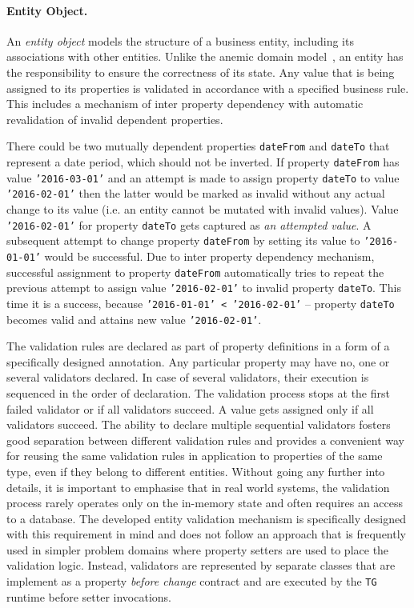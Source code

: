 \documentclass[a4paper,12pt,oneside,openright,final]{memoir} %
\begin{document}
	\paragraph{Entity Object.} 	
  	An \emph{entity object} models the structure of a business entity, including its associations with other entities.
	Unlike the anemic domain model~\cite{fowler2003}, an entity has the responsibility to ensure the correctness of its state.
	Any value that is being assigned to its properties is validated in accordance with a specified business rule.
	This includes a mechanism of inter property dependency with automatic revalidation of invalid dependent properties.
	
	\begin{tcolorbox}[title=Example: dependent properties]
	\footnotesize
		There could be two mutually dependent properties \texttt{dateFrom} and \texttt{dateTo} that represent a date period, which should not be inverted.
		If property \texttt{dateFrom} has value \texttt{'2016-03-01'} and an attempt is made to assign property \texttt{dateTo} to value \texttt{'2016-02-01'} then the latter would be marked as invalid without any actual change to its value (i.e. an entity cannot be mutated with invalid values).
		Value \texttt{'2016-02-01'} for property \texttt{dateTo} gets captured as \emph{an attempted value}.
		A subsequent attempt to change property \texttt{dateFrom} by setting its value to \texttt{'2016-01-01'} would be successful.
		Due to inter property dependency mechanism, successful assignment to property \texttt{dateFrom} automatically tries to repeat the previous attempt to assign value \texttt{'2016-02-01'} to invalid property \texttt{dateTo}.
		This time it is a success, because \texttt{'2016-01-01' < '2016-02-01'} -- property \texttt{dateTo} becomes valid and attains new value \texttt{'2016-02-01'}.
 	\end{tcolorbox}
	
	The validation rules are declared as part of property definitions in a form of a specifically designed annotation.
	Any particular property may have no, one or several validators declared.
	In case of several validators, their execution is sequenced in the order of declaration.
	The validation process stops at the first failed validator or if all validators succeed.
	A value gets assigned only if all validators succeed.
	The ability to declare multiple sequential validators fosters good separation between different validation rules and provides a convenient way for reusing the same validation rules in application to properties of the same type, even if they belong to different entities.
	Without going any further into details, it is important to emphasise that in real world systems, the validation process rarely operates only on the in-memory state and often requires an access to a database.
	The developed entity validation mechanism is specifically designed with this requirement in mind and does not follow an approach that is frequently used in simpler problem domains where property setters are used to place the validation logic.
	Instead, validators are represented by separate classes that are implement as a property \emph{before change} contract and are executed by the \texttt{TG} runtime before setter invocations.
\end{document}
